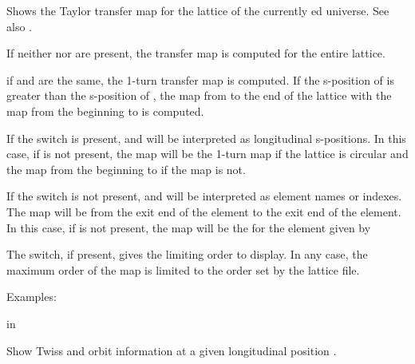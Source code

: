 {{{\begin{description}
{\vskip -0.2in

Shows the Taylor transfer map for the  lattice of the
currently ed universe. See also .

If neither  nor  are present, the transfer map is
computed for the entire lattice.

if  and  are the same, the 1-turn transfer map is
computed. If the s-position of  is greater than the
s-position of , the map from  to the end of the
lattice with the map from the beginning to  is computed.

If the  switch is present,  and  will be
interpreted as longitudinal s-positions. In this case, if  is
not present, the map will be the 1-turn map if the lattice is circular
and the map from the beginning to  if the map is not.

If the  switch is not present,  and  will be
interpreted as element names or indexes. The map will be from the
exit end of the  element to the exit end of the 
element. In this case, if  is not present, the map will be
the for the element given by 

The  switch, if present, gives the limiting order to
display. In any case, the maximum order of the map is limited to the
order set by the lattice file.

Examples:


 in

\item[\protect\parbox{6in}{
    show twiss\_and\_orbit \{-base\} \{-branch <name>\} \{-design\} \\
    \hspace*{0.35in} \{-universe <ix\_uni>\} <s\_position>}] \Newline

\vskip -0.1in

Show Twiss and orbit information at a given longitudinal position . 

}
\end{description}}}}
